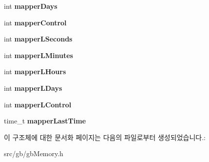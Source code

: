 \begin{DoxyCompactItemize}
int {\bfseries mapper\+Days}
\item 
\mbox{\label{structmapper_m_b_c3_a05a1f6d6d1a63d7b7a9d03fb25b05baf}} 
int {\bfseries mapper\+Control}
\item 
\mbox{\label{structmapper_m_b_c3_a5c7710784dadb3e7060dbb0b9142b704}} 
int {\bfseries mapper\+L\+Seconds}
\item 
\mbox{\label{structmapper_m_b_c3_adb3ee748b8ab95c0a0838149852d38f7}} 
int {\bfseries mapper\+L\+Minutes}
\item 
\mbox{\label{structmapper_m_b_c3_a57baf0090734e5934fcc90b2a4ed371e}} 
int {\bfseries mapper\+L\+Hours}
\item 
\mbox{\label{structmapper_m_b_c3_a064bb5d4f64ac74e8ce84a19f4ceceeb}} 
int {\bfseries mapper\+L\+Days}
\item 
\mbox{\label{structmapper_m_b_c3_aaa650a87f08367af631a599d2ff39655}} 
int {\bfseries mapper\+L\+Control}
\item 
\mbox{\label{structmapper_m_b_c3_a0af0b1504e0506e54dafd63f19bfedf5}} 
time\+\_\+t {\bfseries mapper\+Last\+Time}
\end{DoxyCompactItemize}


이 구조체에 대한 문서화 페이지는 다음의 파일로부터 생성되었습니다.\+:\begin{DoxyCompactItemize}
\item 
src/gb/gb\+Memory.\+h\end{DoxyCompactItemize}
